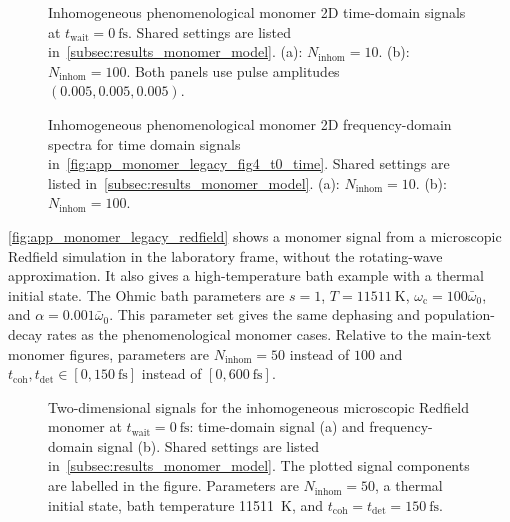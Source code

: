 \begin{figure}[htbp]
    \centering
    \caption{Inhomogeneous phenomenological monomer 2D time-domain signals at
    \(t_{\mathrm{wait}}=\SI{0}{\femto\second}\). Shared settings are listed
    in~\autoref{subsec:results_monomer_model}. (a):
    \(N_{\mathrm{inhom}}=10\). (b): \(N_{\mathrm{inhom}}=100\). Both panels
    use pulse amplitudes \((0.005,0.005,0.005)\).}
    \label{fig:app_monomer_legacy_fig4_t0_time}
\end{figure}

\begin{figure}[htbp]
    \centering
    \caption{Inhomogeneous phenomenological monomer 2D frequency-domain spectra for
    time domain signals in~\autoref{fig:app_monomer_legacy_fig4_t0_time}. Shared
    settings are listed in~\autoref{subsec:results_monomer_model}. (a):
    \(N_{\mathrm{inhom}}=10\). (b): \(N_{\mathrm{inhom}}=100\).}
    \label{fig:app_monomer_legacy_fig4_t0_freq}
\end{figure}


\autoref{fig:app_monomer_legacy_redfield} shows a monomer signal from a microscopic Redfield simulation in the
laboratory frame, without the rotating-wave approximation. It also gives a
high-temperature bath example with a thermal initial state. The Ohmic bath
parameters are \(s=1\), \(T=\SI{11511}{\kelvin}\),
\(\omega_{\mathrm{c}}=100\bar{\omega}_0\), and
\(\alpha=0.001\bar{\omega}_0\). This parameter set gives
the same dephasing and population-decay rates as the phenomenological monomer
cases. Relative to the main-text monomer figures, parameters are
\(N_{\mathrm{inhom}}=50\) instead of \(100\) and \(t_{\mathrm{coh}},t_{\mathrm{det}}\in
[0,\SI{150}{\femto\second}]\) instead of
\([0,\SI{600}{\femto\second}]\).


\begin{figure}[htbp]
    \centering
    \caption{Two-dimensional signals for the inhomogeneous microscopic Redfield
    monomer at \(t_{\mathrm{wait}}=\SI{0}{\femto\second}\): time-domain signal
    (a) and frequency-domain signal (b).
    Shared settings are listed in~\autoref{subsec:results_monomer_model}. The
    plotted signal components are labelled in the figure. Parameters are
    \(N_{\mathrm{inhom}}=50\), a thermal initial state, bath temperature
    \SI{11511}{\kelvin}, and
    \(t_{\mathrm{coh}}=t_{\mathrm{det}}=\SI{150}{\femto\second}\).}
    \label{fig:app_monomer_legacy_redfield}
\end{figure}

